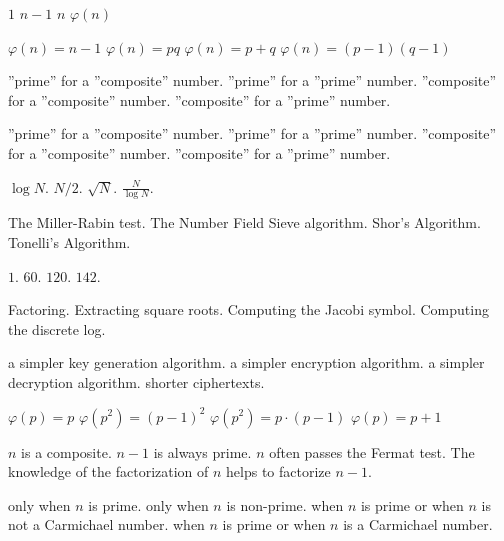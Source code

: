  {$1$}
 {$n-1$}
 {$n$}%
 {$\varphi (n)$}%
 
 
{$\varphi (n) = n-1$}
{$\varphi (n) = pq$}
{$\varphi (n) = p + q$}
{$\varphi (n) = (p-1) (q-1)$}


 
{''prime'' for a ''composite'' number.}
{''prime'' for a ''prime'' number.}
{''composite'' for a ''composite'' number.}
{''composite'' for a ''prime'' number.}

{''prime'' for a ''composite'' number.}
{''prime'' for a ''prime'' number.}
{''composite'' for a ''composite'' number.}
{''composite'' for a ''prime'' number.}

{$\log N$.}
{$N/2$.}
{$\sqrt{N}$.}
{$\frac{N}{\log N}$.}

{The Miller-Rabin test.}
{The Number Field Sieve algorithm.}
{Shor's Algorithm.}
{Tonelli's Algorithm.}

{$1$.}
{$60$.}
{$120$.}
{$142$.}

{Factoring.}
{Extracting square roots.}
{Computing the Jacobi symbol.}
{Computing the discrete log.}

{a simpler key generation algorithm.}
{a simpler encryption algorithm.}
{a simpler decryption algorithm.}
{shorter ciphertexts.}

%
{$\varphi(p)=p$}%
{$\varphi(p^2)=(p-1)^2$}%
{$\varphi(p^2)=p\cdot(p-1)$}%
{$\varphi(p)=p+1$}%

%
{$n$ is a composite.}%
{$n-1$ is always prime.}%
{$n$ often passes the Fermat test.}%
{The knowledge of the factorization of $n$ helps to factorize $n-1$.}%

%
{only when $n$ is prime.}%
{only when $n$ is non-prime.}%
{when $n$ is prime or when $n$ is not a Carmichael number.}%
{when $n$ is prime or when $n$ is a Carmichael number.}%

